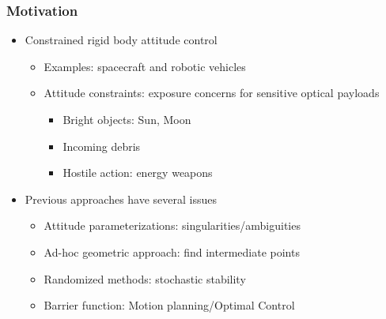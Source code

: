 \documentclass[11pt,professionalfonts]{beamer}
\begin{document}
\begin{frame} %
	\frametitle{Motivation}
	\begin{itemize}
		\item Constrained rigid body attitude control
		\begin{itemize}
			\item Examples: spacecraft and robotic vehicles
			\item Attitude constraints: exposure concerns for sensitive optical payloads
			\begin{itemize}
				\item Bright objects: Sun, Moon
				\item Incoming debris
				\item Hostile action: energy weapons
			\end{itemize}
		\end{itemize}
	\pause
	\item Previous approaches have several issues
	\begin{itemize}
		\item Attitude parameterizations: singularities/ambiguities
		\item Ad-hoc geometric approach: find intermediate points
		\item Randomized methods: stochastic stability 
		\item Barrier function: Motion planning/Optimal Control
	\end{itemize}
\end{itemize}
\end{frame} %
\end{document}

